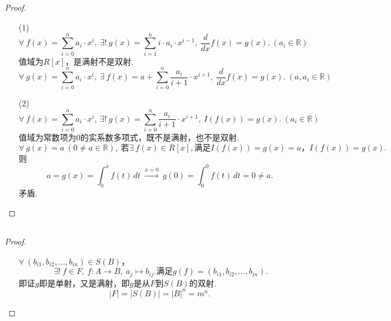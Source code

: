 \documentclass[UTF8]{ctexart}
\begin{document}
\subsection{}   %
\begin{proof}
    \begin{enumerate}
        \item []
        \item [(1)]
        \[
            \forall\ f(x)=\sum\limits_{i=0}^{n} a_i\cdot x^i,\ 
            \exists !\ g(x)=\sum\limits_{i=1}^{n} i\cdot a_i \cdot x^{i-1},\ 
            \frac{d}{dx}f(x)=g(x).\ (a_i \in\mathbb{R})
        \]
        值域为$R[x]$，是满射不是双射.
        \[
            \forall\ g(x)=\sum\limits_{i=0}^{n} a_i\cdot x^i,\ 
            \exists\ f(x)=a+\sum\limits_{i=0}^{n} \frac{a_i}{i+1} \cdot x^{i+1},\ 
            \frac{d}{dx}f(x)=g(x).\ (a,a_i \in\mathbb{R})
        \]
        \item [(2)]
        \[
            \forall\ f(x)=\sum\limits_{i=0}^{n} a_i\cdot x^i,\ 
            \exists !\ g(x)=\sum\limits_{i=0}^{n} \frac{a_i}{i+1} \cdot x^{i+1},\ 
            I(f(x))=g(x).\ (a_i \in\mathbb{R})
        \]
        值域为常数项为0的实系数多项式，既不是满射，也不是双射.
        \[
            \forall\ g(x)=a\ (0\neq a\in\mathbb{R}),\ 
            \mbox{若}\exists\ f(x)\in R[x],\mbox{满足} I(f(x))=g(x)=a，
            I(f(x))=g(x).
        \]
        则
        \[
            a = g(x) = \int_{0}^{x} f(t) \,dt  
            \ \xrightarrow{x=0}\ 
            g(0) = \int_{0}^{0} f(t) \,dt = 0 \neq a.  
        \]
        矛盾.
    \end{enumerate}
\end{proof}

\subsection{}   %
\begin{proof}
    \begin{enumerate}
        \item []$\forall\ (b_{i1}, b_{i2}, \ldots, b_{in}) \in S(B)$，
        \[
            \ \exists !\ f\in F,\ f: A \rightarrow B,\ a_j \mapsto b_{ij}. 
            \mbox{满足} g(f) = (b_{i1}, b_{i2}, \ldots, b_{in}) .
        \]
        即证$g$即是单射，又是满射，即$g$是从$F$到$S(B)$的双射.
        \[
            |F| = |S(B)| = {|B|}^{n} = m^{n}.
        \]
    \end{enumerate}
\end{proof}
\end{document}
